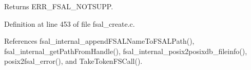 \begin{DoxyReturn}{Returns}
ERR\_\-FSAL\_\-NOTSUPP. 
\end{DoxyReturn}


Definition at line 453 of file fsal\_\-create.c.

References fsal\_\-internal\_\-appendFSALNameToFSALPath(), fsal\_\-internal\_\-getPathFromHandle(), fsal\_\-internal\_\-posix2posixdb\_\-fileinfo(), posix2fsal\_\-error(), and TakeTokenFSCall().